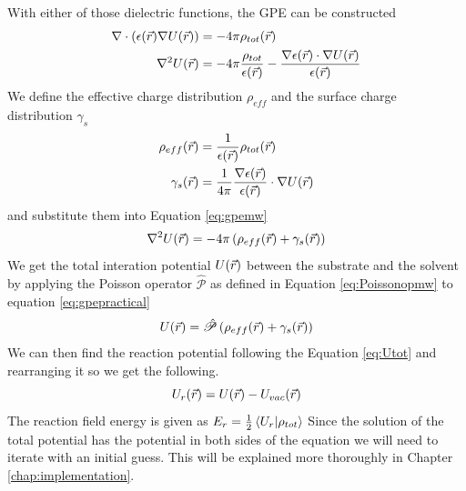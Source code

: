 \documentclass[../master_thesis.tex]{subfiles}
\begin{document}
With either of those dielectric functions, the \ac{GPE} can be constructed
\cite{Sorland, FossoTande:2013ka}
\begin{align}\label{eq:gpemw}
  \nabla\cdot (\epsilon(\vec{r})\nabla U(\vec{r})) &= -4\pi \rho_{tot}(\vec{r}) \\
  \nabla^2U(\vec{r}) &= -4\pi \frac{\rho_{tot}}{\epsilon(\vec{r})} - \frac{\nabla
  \epsilon(\vec{r})\cdot \nabla U(\vec{r})}{\epsilon(\vec{r})}
\end{align}
We define the effective charge distribution $\rho_{eff}$ and the surface charge
distribution $\gamma_s$ \cite{FossoTande:2013ka}
\begin{align}
  \rho_{eff}(\vec{r}) &= \frac{1}{\epsilon(\vec{r})}\rho_{tot}(\vec{r}) \\
  \gamma_s(\vec{r}) &= \frac{1}{4\pi}\frac{\nabla\epsilon(\vec{r})}{\epsilon(\vec{r})}\cdot\nabla U(\vec{r})
\end{align}
and substitute them into Equation \ref{eq:gpemw}
\begin{equation}\label{eq:gpepractical}
  \nabla^2U(\vec{r}) = -4\pi\left( \rho_{eff}(\vec{r}) + \gamma_s(\vec{r})\right)
\end{equation}
We get the total interation potential $U(\vec{r})$ between the substrate and the solvent by
applying the Poisson operator $\hat{\mathscr{P}}$ as defined in Equation
\ref{eq:Poissonopmw} to equation \ref{eq:gpepractical}
\begin{equation}
  U(\vec{r}) = \hat{\mathscr{P}}\left( \rho_{eff}(\vec{r}) + \gamma_s(\vec{r})\right)
\end{equation}
We can then find the reaction potential following the Equation \ref{eq:Utot} and
rearranging it so we get the following.
\begin{equation}
  U_r(\vec{r}) = U(\vec{r}) - U_{vac}(\vec{r})
\end{equation}
The reaction field energy is given as \cite{FossoTande:2013ka}
$E_r = \frac{1}{2}\braket{U_r | \rho_{tot}}$
Since the solution of the total potential has the potential in both sides of the
equation we will need to iterate with an initial guess. This will be explained
more thoroughly in Chapter \ref{chap:implementation}.




\biblio
\end{document}
